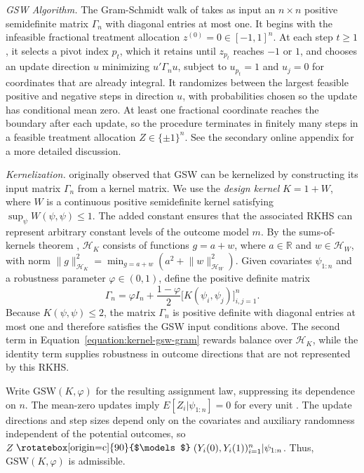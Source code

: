 \documentclass[letterpaper,12pt]{article}
\theoremstyle{definition}
\numberwithin{equation}{section}
\newcommand{\mr}{\mathbb{R}}
\newcommand{\mc}{\mathcal}
\newcommand{\norm}[1]{\lVert#1\rVert}
\newcommand{\indep}{\mathrel{\raisebox{0.05em}{\rotatebox[origin=c]{90}{$\models$}}}}
\begin{document}
\emph{GSW Algorithm.} The Gram-Schmidt walk of \citet{bansal2019gram} takes as input an $n\times n$ positive semidefinite matrix $\Gamma_n$ with diagonal entries at most one.
It begins with the infeasible fractional treatment allocation $z^{(0)}=0\in[-1,1]^n$.
At each step $t\geq1$, it selects a pivot index $p_t$, which it retains until $z_{p_t}$ reaches $-1$ or $1$, and chooses an update direction $u$ minimizing $u'\Gamma_nu$, subject to $u_{p_t}=1$ and $u_j=0$ for coordinates that are already integral.
It randomizes between the largest feasible positive and negative steps in direction $u$, with probabilities chosen so the update has conditional mean zero.
At least one fractional coordinate reaches the boundary after each update, so the procedure terminates in finitely many steps in a feasible treatment allocation $Z \in \{\pm 1\}^n$.
See the secondary online appendix for a more detailed discussion.

\emph{Kernelization.}
\citet{harshaw2021dissertation} originally observed that GSW can be kernelized by constructing its input matrix $\Gamma_n$ from a kernel matrix.
We use the \emph{design kernel} $K=1+W$, where $W$ is a continuous positive semidefinite kernel satisfying $\sup_\psi W(\psi,\psi)\leq1$.
The added constant ensures that the associated RKHS can represent arbitrary constant levels of the outcome model $m$.
By the sums-of-kernels theorem \citep{paulsen2016rkhs}, $\mc H_K$ consists of functions $g=a+w$, where $a\in\mr$ and $w\in\mc H_W$, with norm $\norm{g}_{\mc H_K}^2=\min_{g=a+w}(a^2+\norm{w}_{\mc H_W}^2)$.
Given covariates $\psi_{1:n}$ and a robustness parameter $\varphi\in(0,1)$, define the positive definite matrix
\begin{equation}\label{equation:kernel-gsw-gram}
\Gamma_n = \varphi I_n + \frac{1-\varphi}{2} \bigl[K(\psi_i,\psi_j)\bigr]_{i,j=1}^n.
\end{equation}
Because $K(\psi,\psi)\leq2$, the matrix $\Gamma_n$ is positive definite with diagonal entries at most one and therefore satisfies the GSW input conditions above.
The second term in Equation~\eqref{equation:kernel-gsw-gram} rewards balance over $\mc H_K$, while the identity term supplies robustness in outcome directions that are not represented by this RKHS.

Write $\mathrm{GSW}(K,\varphi)$ for the resulting assignment law, suppressing its dependence on $n$.
The mean-zero updates imply $E[Z_i|\psi_{1:n}]=0$ for every unit \citep{harshaw2024gsw}.
The update directions and step sizes depend only on the covariates and auxiliary randomness independent of the potential outcomes, so $Z \indep (Y_i(0),Y_i(1))_{i=1}^n | \psi_{1:n}$.
Thus, $\mathrm{GSW}(K,\varphi)$ is admissible.
\end{document}
